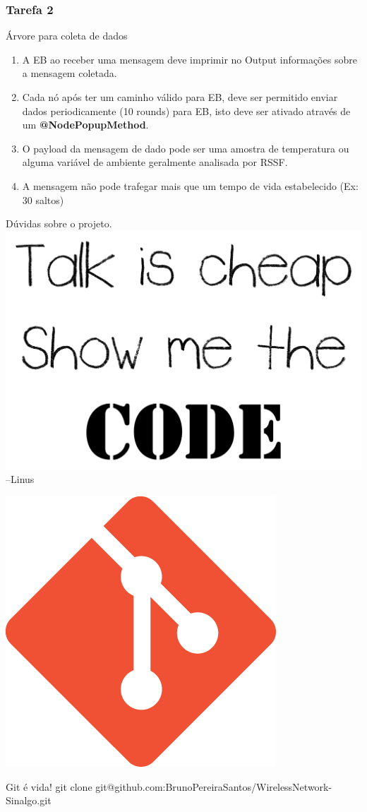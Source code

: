 \documentclass{beamer}
\begin{document}
\begin{frame}
	\frametitle{Tarefa 2}
	\begin{alertblock}{Árvore para coleta de dados}
		\begin{enumerate}

			\item A EB ao receber uma mensagem deve imprimir no Output informações sobre a mensagem coletada.

			\item Cada nó após ter um caminho válido para EB, deve ser permitido enviar dados periodicamente (10 rounds) para EB, isto deve ser ativado através de um \textbf{@NodePopupMethod}.

			\item O payload da mensagem de dado pode ser uma amostra de temperatura ou alguma variável de ambiente geralmente analisada por RSSF.

			\item A mensagem não pode trafegar mais que um tempo de vida estabelecido (Ex: 30 saltos)
		\end{enumerate}
	\end{alertblock}
\end{frame}


\begin{frame}{Dúvidas sobre o projeto.}
	\centering
	\includegraphics[width=.6\linewidth]{img/torvalds.png}
	\flushright
	--Linus
\end{frame}
\begin{frame}
\footnotesize
\centering

	\includegraphics[width=0.22\linewidth]{img/git.png}
	\begin{exampleblock}{Git é vida!}
		git clone git@github.com:BrunoPereiraSantos/WirelessNetwork-Sinalgo.git
	\end{exampleblock}

\end{frame}
\end{document}
